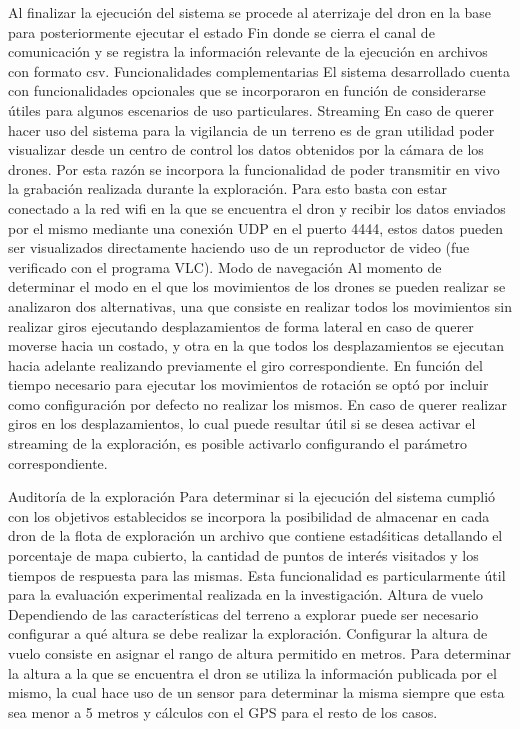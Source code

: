 Al finalizar la ejecución del sistema se procede al aterrizaje del dron en la base para posteriormente ejecutar el estado Fin donde se cierra el canal de comunicación y se registra la información relevante de la ejecución en archivos con formato csv.
Funcionalidades complementarias
El sistema desarrollado cuenta con funcionalidades opcionales que se incorporaron en función de considerarse útiles para algunos escenarios de uso particulares.
Streaming
En caso de querer hacer uso del sistema para la vigilancia de un terreno es de gran utilidad poder visualizar desde un centro de control los datos obtenidos por la cámara de los drones.
Por esta razón se incorpora la funcionalidad de poder transmitir en vivo la grabación realizada durante la exploración. Para esto basta con estar conectado a la red wifi en la que se encuentra el dron y recibir los datos enviados por el mismo mediante una conexión UDP en el puerto 4444, estos datos pueden ser visualizados directamente haciendo uso de un reproductor de video (fue verificado con el programa VLC).
Modo de navegación
Al momento de determinar el modo en el que los movimientos de los drones se pueden realizar se analizaron dos alternativas, una que consiste en realizar todos los movimientos sin realizar giros ejecutando desplazamientos de forma lateral en caso de querer moverse hacia un costado, y otra en la que todos los desplazamientos se ejecutan hacia adelante realizando previamente el giro correspondiente.
En función del tiempo necesario para ejecutar los movimientos de rotación se optó por incluir como configuración por defecto no realizar los mismos.
En caso de querer realizar giros en los desplazamientos, lo cual puede resultar útil si se desea activar el streaming de la exploración, es posible activarlo configurando el parámetro correspondiente.

Auditoría de la exploración
Para determinar si la ejecución del sistema cumplió con los objetivos establecidos se incorpora la posibilidad de almacenar en cada dron de la flota de exploración un archivo que contiene estadśiticas detallando el porcentaje de mapa cubierto, la cantidad de puntos de interés visitados y los tiempos de respuesta para las mismas. 
Esta funcionalidad es particularmente útil para la evaluación experimental realizada en la investigación.
Altura de vuelo
Dependiendo de las características del terreno a explorar puede ser necesario configurar a qué altura se debe realizar la exploración. Configurar la altura de vuelo consiste en asignar el rango de altura permitido en metros.
Para determinar la altura a la que se encuentra el dron se utiliza la información publicada por el mismo, la cual hace uso de un sensor para determinar la misma siempre que esta sea menor a 5 metros y cálculos con el GPS para el resto de los casos. 
